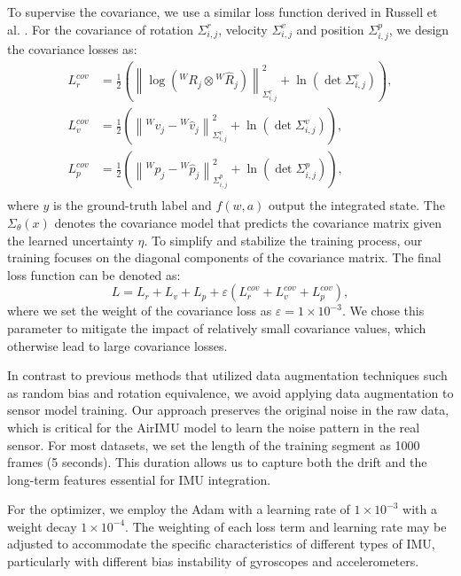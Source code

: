 To supervise the covariance, we use a similar loss function derived in Russell et al.  \cite{russell2021multivariate}. 
For the covariance of rotation $\Sigma^r_{i,j}$, velocity $\Sigma^v_{i,j}$ and position $\Sigma^p_{i,j}$, we design the covariance losses as:
\begin{equation}
\label{Eq: cov loss}
    \begin{split}
        L^{cov}_r &= \frac{1}{2}\left(\left\|\log({}^WR_j \otimes  {}^W \hat R_j)\right\|^2_{\Sigma^r_{i,j}}  + \ln (\det\Sigma^r_{i,j})\right), \\
        L^{cov}_v &= \frac{1}{2}\left(\left\|{}^Wv_j - {}^W \hat v_j\right\|^2_{\Sigma^v_{i,j}} + \ln (\det \Sigma^v_{i,j})\right), \\
        L^{cov}_p &= \frac{1}{2} \left(\left\|{}^W p_j - {}^W \hat p_j\right\|^2_{\Sigma^p_{i,j}}  + \ln (\det \Sigma^p_{i,j})\right), \\
    \end{split}
\end{equation}
where $y$ is the ground-truth label and $f(w, a)$ output the integrated state. 
The $\Sigma_\theta(x)$ denotes the covariance model that predicts the covariance matrix given the learned uncertainty $\eta$. 
To simplify and stabilize the training process, our training focuses on the diagonal components of the covariance matrix.
The final loss function can be denoted as:
\begin{equation}
L = L_r + L_v + L_p + \varepsilon (L^{cov}_r + L^{cov}_v +L^{cov}_p),
\end{equation}
where we set the weight of the covariance loss as $\varepsilon = 1\times 10^{-3}$.
We chose this parameter to mitigate the impact of relatively small covariance values, which otherwise lead to large covariance losses.

In contrast to previous methods that utilized data augmentation techniques such as random bias and rotation equivalence, we avoid applying data augmentation to sensor model training.
Our approach preserves the original noise in the raw data, which is critical for the AirIMU model to learn the noise pattern in the real sensor.
For most datasets, we set the length of the training segment as 1000 frames (5 seconds). 
This duration allows us to capture both the drift and the long-term features essential for IMU integration.

For the optimizer, we employ the Adam with a learning rate of $1 \times 10^{-3}$ with a weight decay $1 \times 10^{-4}$.
The weighting of each loss term and learning rate may be adjusted to accommodate the specific characteristics of different types of IMU, particularly with different bias instability of gyroscopes and accelerometers.

